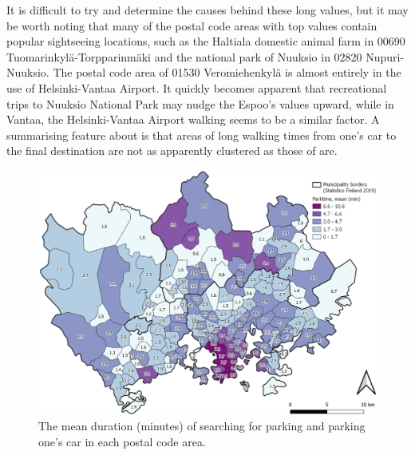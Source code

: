 It is difficult to try and determine the causes behind these long  values, but it may be worth noting that many of the postal code areas with top values contain popular sightseeing locations, such as the Haltiala domestic animal farm in 00690 Tuomarinkylä-Torpparinmäki and the national park of Nuuksio in 02820 Nupuri-Nuuksio. The postal code area of 01530 Veromiehenkylä is almost entirely in the use of Helsinki-Vantaa Airport. It quickly becomes apparent that recreational trips to Nuuksio National Park may nudge the Espoo's  values upward, while in Vantaa, the Helsinki-Vantaa Airport walking seems to be a similar factor. A summarising feature about  is that areas of long walking times from one's car to the final destination are not as apparently clustered as those of  are.


\begin{figure}
    \centering
    \includegraphics[width=\textwidth]{images/thesis_postalvis_parkmean.png}
    \caption[Parktime, mean, in the research area]{The mean duration (minutes) of searching for parking and parking one's car in each postal code area.}%
    \label{fig:postalvis_parkmean}%
\end{figure}


